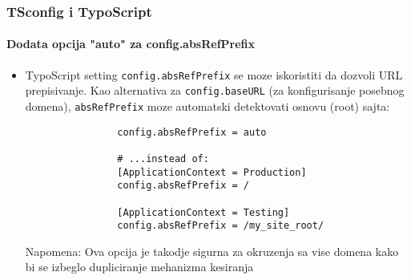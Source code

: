 \begin{frame}[fragile]
	\frametitle{TSconfig i TypoScript}
	\framesubtitle{Dodata opcija "auto" za config.absRefPrefix}

	\begin{itemize}
		\item TypoScript setting \texttt{config.absRefPrefix} se moze iskoristiti da dozvoli URL prepisivanje.
			Kao alternativa za \texttt{config.baseURL} (za konfigurisanje posebnog domena), \texttt{absRefPrefix} moze automatski detektovati osnovu (root) sajta:

			\begin{lstlisting}
				config.absRefPrefix = auto

				# ...instead of:
				[ApplicationContext = Production]
				config.absRefPrefix = /

				[ApplicationContext = Testing]
				config.absRefPrefix = /my_site_root/
			\end{lstlisting}

		\smaller
			Napomena: Ova opcija je takodje sigurna za okruzenja sa vise domena kako bi se izbeglo dupliciranje mehanizma kesiranja
		\normalsize

	\end{itemize}

\end{frame}


